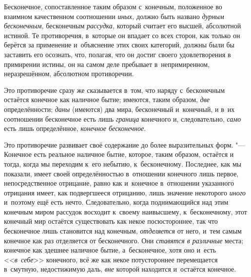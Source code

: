 Бесконечное, сопоставленное таким образом с~конечным, положенное во взаимном
качественном соотношении {\em иных,} должно быть
названо {\em дурным бесконечным,} бесконечным
{\em рассудка,} который считает его высшей, абсолютной
истиной. Те противоречия, в~которые он впадает со всех сторон, как только
он берётся за применение и~объяснение этих своих категорий, должны были бы
заставить его осознать, что, полагая, что он достиг своего удовлетворения в
примирении истины, он на самом деле пребывает в~непримиренном,
неразрешённом, абсолютном противоречии.

Это противоречие сразу же сказывается в~том, что наряду с~бесконечным
остаётся конечное как наличное бытие; имеются, таким образом,
{\em две} определённости;
{\em даны} (имеются) два мира, бесконечный и~конечный,
и в~их соотношении бесконечное есть лишь {\em граница}
конечного и, следовательно, {\em само} есть лишь
определённое, {\em конечное бесконечное}.

Это противоречие развивает своё содержание до более выразительных форм. "---
Конечное есть реальное наличное бытие, которое, таким образом, остаётся и
тогда, когда мы переходим к~его небытию, к~бесконечному. Последнее, как мы
показали, имеет своей определённостью в~отношении конечного лишь первое,
непосредственное отрицание, равно как и~конечное в~отношении указанного
отрицания имеет, как подвергшееся отрицанию, лишь значение некоторого
{\em иного} и~поэтому ещё есть нечто. Следовательно,
когда поднимающийся над этим конечным миром рассудок восходит к~своему
наивысшему, к~бесконечному, этот конечный мир остаётся существовать как
некое посюстороннее, так что бесконечное лишь становится над конечным,
{\em отделяется} от него, и~тем самым конечное как раз
отделяется от бесконечного. Они {\em ставятся в
различные} места; конечное как здешнее наличное бытие, а~бесконечное, хотя
оно и~есть <<{\em в~себе}>> конечного, всё же как некое
потустороннее перемещается в~смутную, недостижимую даль,
{\em вне} которой находится и~остаётся конечное.

